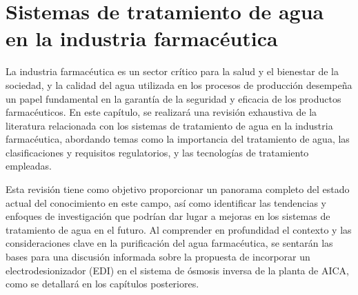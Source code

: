 \section{Sistemas de tratamiento de agua en la industria farmacéutica}

La industria farmacéutica es un sector crítico para la salud y el bienestar de la sociedad, y la calidad del agua utilizada
en los procesos de producción desempeña un papel fundamental en la garantía de la seguridad y eficacia de los productos farmacéuticos. En este capítulo,
se realizará una revisión exhaustiva de la literatura relacionada con los sistemas de tratamiento de agua en la industria farmacéutica, abordando temas
como la importancia del tratamiento de agua, las clasificaciones y requisitos regulatorios, y las tecnologías de tratamiento empleadas.

Esta revisión tiene como objetivo proporcionar un panorama completo del estado actual del conocimiento en este campo, así como identificar las tendencias y enfoques de investigación que podrían dar lugar a mejoras en los sistemas de tratamiento de agua en el futuro. Al comprender en profundidad el contexto y las consideraciones clave en la purificación del agua farmacéutica, se sentarán las bases para una discusión informada sobre la propuesta de incorporar un electrodesionizador (EDI) en el sistema de ósmosis inversa de la planta de AICA, como se detallará en los capítulos posteriores.







% 
